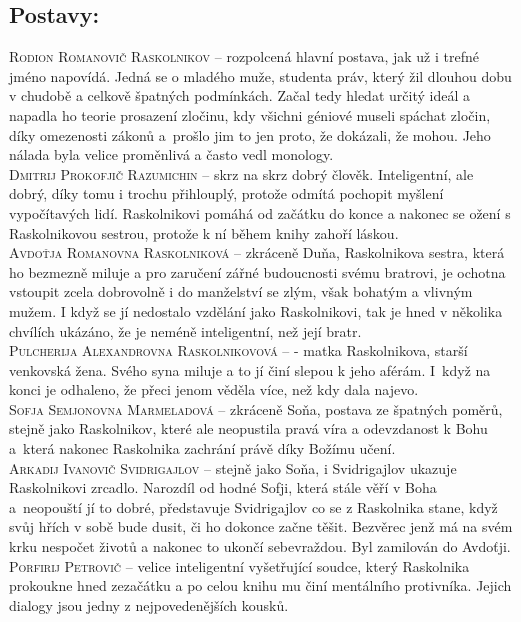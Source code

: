 \documentclass[A4paper]{extarticle} %
\begin{document}
\subsection*{Postavy:}
\noindent 
\textsc{Rodion Romanovič Raskolnikov --} rozpolcená hlavní postava, jak už i trefné jméno napovídá. Jedná se o mladého muže, studenta práv, který žil dlouhou dobu v chudobě a celkově špatných podmínkách. Začal tedy hledat určitý ideál a napadla ho teorie prosazení zločinu, kdy všichni géniové museli spáchat zločin, díky omezenosti zákonů a~prošlo jim to jen proto, že dokázali, že mohou. Jeho nálada byla velice proměnlivá a často vedl monology. \\
\textsc{Dmitrij Prokofjič Razumichin --} skrz na skrz dobrý člověk. Inteligentní, ale dobrý, díky tomu i trochu přihlouplý, protože odmítá pochopit myšlení vypočítavých lidí. Raskolnikovi pomáhá od začátku do konce a nakonec se ožení s Raskolnikovou sestrou, protože k ní během knihy zahoří láskou. \\
\textsc{Avdoťja Romanovna Raskolniková --} zkráceně Duňa, Raskolnikova sestra, která ho bezmezně miluje a pro zaručení zářné budoucnosti svému bratrovi, je ochotna vstoupit zcela dobrovolně i do manželství se zlým, však bohatým a vlivným mužem. I když se jí nedostalo vzdělání jako Raskolnikovi, tak je hned v několika chvílích ukázáno, že je neméně inteligentní, než její bratr. \\
\textsc{Pulcherija Alexandrovna Raskolnikovová --} - matka Raskolnikova, starší venkovská žena. Svého syna miluje a to jí činí slepou k jeho aférám. I~když na konci je odhaleno, že přeci jenom věděla více, než kdy dala najevo. \\
\textsc{Sofja Semjonovna Marmeladová --} zkráceně Soňa, postava ze špatných poměrů, stejně jako Raskolnikov, které ale neopustila pravá víra a odevzdanost k Bohu a~která nakonec Raskolnika zachrání právě díky Božímu učení. \\
\textsc{Arkadij Ivanovič Svidrigajlov --} stejně jako Soňa, i Svidrigajlov ukazuje Raskolnikovi zrcadlo. Narozdíl od hodné Sofji, která stále věří v Boha a~neopouští jí to dobré, představuje Svidrigajlov co se z Raskolnika stane, když svůj hřích v sobě bude dusit, či ho dokonce začne těšit. Bezvěrec jenž má na svém krku nespočet životů a nakonec to ukončí sebevraždou. Byl zamilován do Avdoťji. \\
\textsc{Porfirij Petrovič --} velice inteligentní vyšetřující soudce, který Raskolnika prokoukne hned zezačátku a po celou knihu mu činí mentálního protivníka. Jejich dialogy jsou jedny z nejpovedenějších kousků.
\end{document}
